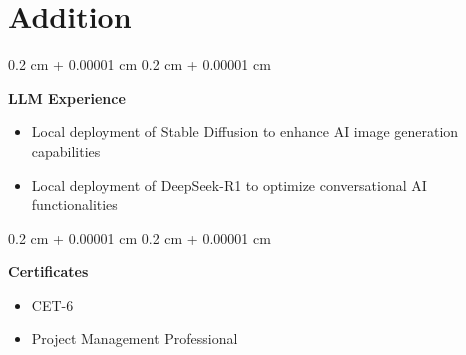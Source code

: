 \documentclass[10pt, letterpaper]{article}
\newenvironment{highlights}{
	\begin{itemize}[
		topsep=0.10 cm,
		parsep=0.10 cm,
		partopsep=0pt,
		itemsep=0pt,
		leftmargin=0.4 cm + 10pt
		]
	}{
	\end{itemize}
} %
\newenvironment{onecolentry}{
	\begin{adjustwidth}{
			0.2 cm + 0.00001 cm
		}{
			0.2 cm + 0.00001 cm
		}
	}{
	\end{adjustwidth}
} %
\begin{document}
			\section{Addition}
			
			\begin{onecolentry}
				\textbf{LLM Experience}
				\begin{highlights}
					\item Local deployment of Stable Diffusion to enhance AI image generation capabilities
					\item Local deployment of DeepSeek-R1 to optimize conversational AI functionalities
				\end{highlights}
			\end{onecolentry}
			
			\vspace{0.2 cm}
			
			\begin{onecolentry}
				\textbf{Certificates} 
				\begin{highlights}
					\item CET-6
					\item Project Management Professional
				\end{highlights}
			\end{onecolentry}
			
			
			
			
		
\end{document}
